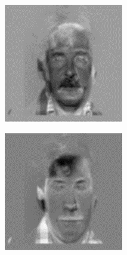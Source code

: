\begin{figure}[ht]
  \centering
  \begin{subfigure}[b]{0.2\textwidth}
    \centering
    \includegraphics[width=\textwidth]{images/q3_eigenface_res1.png}
  \end{subfigure}
  \hspace{2em}
  \begin{subfigure}[b]{0.2\textwidth}
    \centering
    \includegraphics[width=\textwidth]{images/q3_eigenface_res2.png}

\end{subfigure}
\end{figure}
